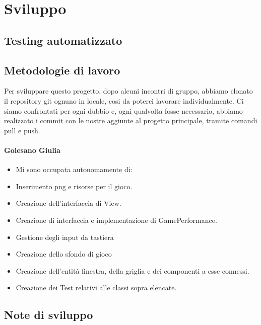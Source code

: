 \documentclass[a4paper,12pt]{report}
\begin{document}
\chapter{Sviluppo}
\section{Testing automatizzato}

\section{Metodologie di lavoro}
Per sviluppare questo progetto, dopo alcuni incontri di gruppo, abbiamo clonato il repository git ognuno in locale, cosi da poterci lavorare individualmente.
Ci siamo confrontati per ogni dubbio e, ogni qualvolta fosse necessario, abbiamo realizzato i commit con le nostre aggiunte al progetto principale, tramite comandi pull e push.

\subsubsection{Golesano Giulia}
\begin{itemize}
    \item Mi sono occupata autonomamente di:
    \item Inserimento png e risorse per il gioco.
    \item Creazione dell'interfaccia di View.
    \item Creazione di interfaccia e implementazione di GamePerformance.
    \item Gestione degli input da tastiera
    \item Creazione dello sfondo di gioco
    \item Creazione dell'entità finestra, della griglia e dei componenti a esse connessi.
    \item Creazione dei Test relativi alle classi sopra elencate.
\end{itemize}

\section{Note di sviluppo}
\end{document}
